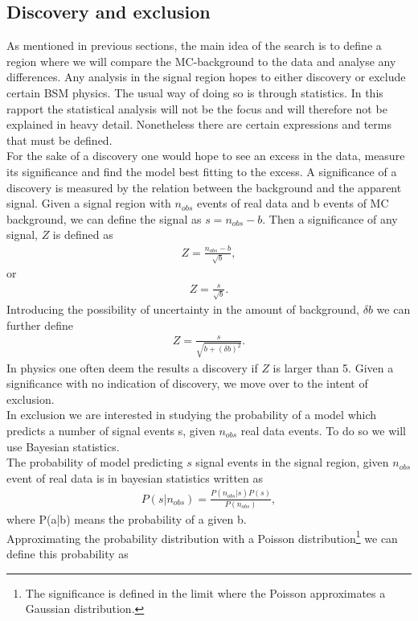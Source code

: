 \documentclass{article}
\begin{document}
\subsection{Discovery and exclusion}
As mentioned in previous sections, the main idea of the search is to define a region where we will compare the MC-background to the data and analyse any differences. Any analysis in the signal region hopes to either discovery or exclude certain BSM physics. The usual way of doing so is through statistics. In this rapport the statistical analysis will not be the focus and will therefore not be explained in heavy detail. Nonetheless there are certain expressions and terms that must be defined.
\\
For the sake of a discovery one would hope to see an excess in the data, measure its significance and find the model best fitting to the excess. A significance of a discovery is measured by the relation between the background and the apparent signal. Given a signal region with $n_{obs}$ events of real data and b events of MC background, we can define the signal as $s = n_{obs}-b$. Then a significance of any signal, $Z$ is defined as 
\begin{align}
    Z = \frac{n_{obs}-b}{\sqrt{b}},
\end{align}
or 
\begin{align}
    Z = \frac{s}{\sqrt{b}}.
\end{align}
Introducing the possibility of uncertainty in the amount of background, $\delta b$ we can further define
\begin{align}\label{eq:Z}
    Z = \frac{s}{\sqrt{b+(\delta b)^2}}.
\end{align}
In physics one often deem the results a discovery if $Z$ is larger than 5.  Given a significance with no indication of discovery, we move over to the intent of exclusion.\\
In exclusion we are interested in studying the probability of a model which predicts a number of signal events s, given $n_{obs}$ real data events. To do so we will use Bayesian statistics.
\\
The probability of model predicting $s$ signal events in the signal region, given $n_{obs}$ event of real data is in bayesian statistics written as
\begin{align}\label{eq:bays}
    P(s|n_{obs}) = \frac{P(n_{obs}|s)P(s)}{P(n_{obs})},
\end{align}
where P(a|b) means the probability of a given b.\\
Approximating the probability distribution with a Poisson distribution\footnote{The significance is defined in the limit where the Poisson approximates a Gaussian distribution.} we can define this probability as
\end{document}
